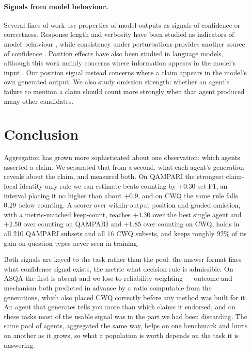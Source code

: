 \documentclass[11pt]{article}
\begin{document}
\paragraph{Signals from model behaviour.}
Several lines of work use properties of model outputs as signals of confidence or correctness. Response length and verbosity have been studied as indicators of model behaviour \citep{janiak2025illusion,zhang2024verbosity}, while consistency under perturbations provides another source of confidence \citep{wu2026this,ahn2025prompt}. Position effects have also been studied in language models, although this work mainly concerns where information appears in the model's input \citep{guo2024serial,zhang2026position,salvatore2025lost,qiao2026llm}. Our position signal instead concerns where a claim appears in the model's own generated output. We also study omission strength: whether an agent's failure to mention a claim should count more strongly when that agent produced many other candidates.



\section{Conclusion}
\label{sec:conclusion}

Aggregation has grown more sophisticated about one observation: which agents asserted a claim. We separated that from a second, what each agent's generation reveals about the claim, and measured both. On QAMPARI the strongest claim-local identity-only rule we can estimate beats counting by $+0.30$ set F1, an interval placing it no higher than about $+0.9$, and on CWQ the same rule falls $0.29$ below counting. A scorer over within-output position and graded omission, with a metric-matched keep-count, reaches $+4.30$ over the best single agent and $+2.50$ over counting on QAMPARI and $+1.85$ over counting on CWQ, holds in all 210 QAMPARI subsets and all 16 CWQ subsets, and keeps roughly $92\%$ of its gain on question types never seen in training.

Both signals are keyed to the task rather than the pool: the answer format fixes what confidence signal exists, the metric what decision rule is admissible. On ASQA the first is absent and we lose to reliability weighting --- outcome and mechanism both predicted in advance by a ratio computable from the generations, which also placed CWQ correctly before any method was built for it. An agent that generates tells you more than which claims it endorsed, and on these tasks most of the usable signal was in the part we had been discarding. The same pool of agents, aggregated the same way, helps on one benchmark and hurts on another as it grows, so what a population is worth depends on the task it is answering.
\end{document}
